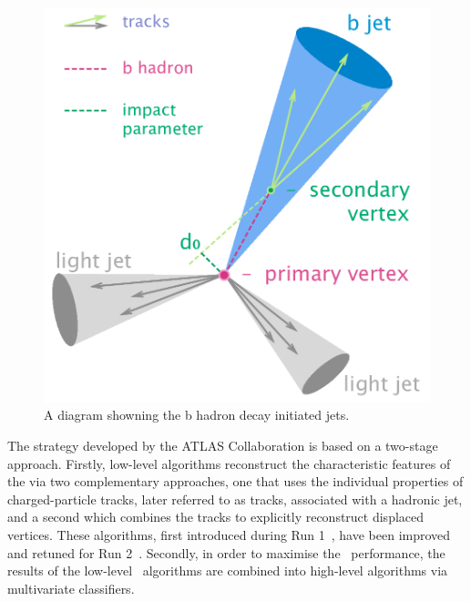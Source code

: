 \documentclass[letterpaper,12pt]{article}
\begin{document}
\begin{figure}[]
	\begin{centering}	
	\includegraphics[width=.4\textwidth]{FTAG_plots/B-tagging_diagram.png}
	\caption{A diagram showning the b hadron decay initiated jets. }
	\label{fig:b-jet-decay}
	\end{centering}
\end{figure}


The strategy developed by the ATLAS Collaboration is based on a two-stage approach. 
Firstly, low-level algorithms reconstruct the characteristic features of 
the \bjets via two complementary approaches, one that uses the 
individual properties of charged-particle tracks, later referred 
to as tracks, associated with a hadronic jet, and a second which 
combines the tracks to explicitly reconstruct displaced vertices. 
These algorithms, first introduced during Run 1~\cite{PERF-2012-04}, 
have been improved and retuned for Run 2~\cite{FTAG-2018-01}. 
Secondly, in order to 
maximise the \btagging\ performance, the results of the low-level 
\btagging\ algorithms are combined into high-level algorithms 
via multivariate classifiers. 
\end{document}
